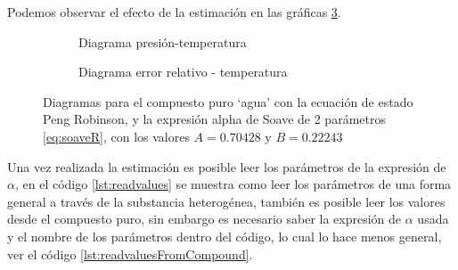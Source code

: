 	Podemos observar el efecto de la estimación en las gráficas \ref{fig:ptdiagramafter}.



\begin{figure}[!h]
   \begin{subfigure}[t]{.5\textwidth}
        \caption{Diagrama presión-temperatura}
        \label{fig:pressuretemperatureafter}
    \end{subfigure}
    \qquad
    \begin{subfigure}[t]{.5\textwidth}
		\caption{Diagrama error relativo - temperatura}\label{fig:relativeerrorafter}
	\end{subfigure}
	\caption{Diagramas para el compuesto puro `agua' con la ecuación de estado Peng Robinson, y la expresión alpha de Soave de 2 parámetros \ref{eq:soaveR}, con los valores $A =0.70428$ y $B =0.22243$}\label{fig:ptdiagramafter}
\end{figure}



	Una vez realizada la estimación es posible leer los parámetros de la expresión de $\alpha$, en el código \ref{lst:readvalues} se muestra como leer los parámetros de una forma general a través de la substancia heterogénea, también es posible leer los valores desde el compuesto puro, sin embargo es necesario saber la expresión de $\alpha$ usada y el nombre de los parámetros dentro del código, lo cual lo hace menos general, ver el código \ref{lst:readvaluesFromCompound}.


